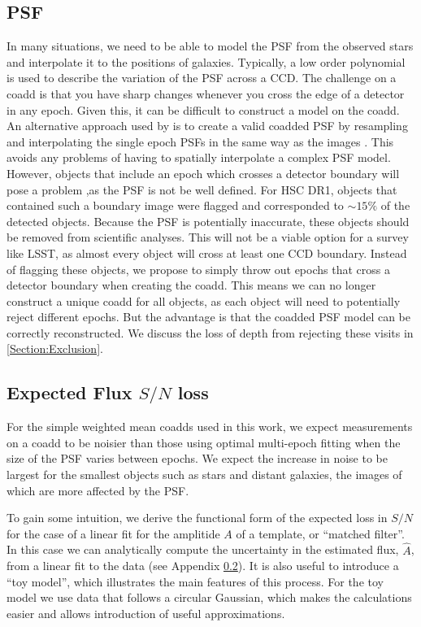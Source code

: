 \documentclass[fleqn,useAMS,usenatbib]{mnras}
\begin{document}
\subsection{PSF}
\label{Subsection:PSF}
In many situations, we need to be able to model the PSF from the observed stars 
and interpolate it to the positions of galaxies.  Typically, a low order 
polynomial is used to describe the variation of the PSF across a CCD.  The 
challenge on a coadd is that you have sharp changes whenever you cross the edge 
of a detector in any epoch.  Given this, it can be difficult to construct a 
model on the coadd.  An alternative approach used by 
\cite{Jee2016,Mandelbaum2018} is to create a valid coadded PSF by resampling 
and interpolating the single epoch PSFs in the same way as the images 
\cite{DLS, HSC}.  This avoids any problems of having to spatially interpolate a 
complex PSF model.  However, objects that include an epoch which crosses a 
detector boundary will pose a problem ,as the PSF is not be well defined.  For 
HSC DR1, objects that contained such a boundary image were flagged and 
corresponded to $\sim15\%$ of the detected objects.  Because the PSF is 
potentially inaccurate, these objects should be removed from scientific 
analyses.  This will not be a viable option for a survey like LSST, as almost 
every object will cross at least one CCD boundary.  Instead of flagging these 
objects, we propose to simply throw out epochs that cross a detector boundary 
when creating the coadd.  This means we can no longer construct a unique coadd 
for all objects, as each object will need to potentially reject different 
epochs.  But the advantage is that the coadded PSF model can be correctly 
reconstructed.  We discuss the loss of depth from rejecting these visits in 
\ref{Section:Exclusion}.

\subsection{Expected Flux $S/N$ loss}
\label{Subsection:FluxSN}


For the simple weighted mean coadds used in this work, we expect measurements
on a coadd to be noisier than those using optimal multi-epoch fitting when the
size of the PSF varies between epochs.  We expect the increase in noise to be
largest for the smallest objects such as stars and distant galaxies, the images
of which are more affected by the PSF.

To gain some intuition, we derive the functional form of the expected loss in
$S/N$ for the case of a linear fit for the amplitide $A$ of a template, or
``matched filter''.  In this case we can analytically compute the uncertainty
in the estimated flux, $\hat{A}$, from a linear fit to the data (see Appendix
\ref{Subsection:FluxSN}). It is also useful to introduce a ``toy model'', which
illustrates the main features of this process.  For the toy model we use data
that follows a circular Gaussian, which makes the calculations easier and
allows introduction of useful approximations.
\end{document}
